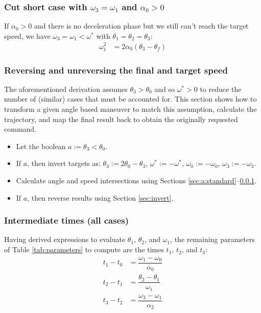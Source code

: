 \documentclass[12pt, a4paper]
{article}
\providecommand{\lr}[1]{\left(#1\right)}
\providecommand{\w}{\omega}
\providecommand{\wt}{\w^*}
\renewcommand{\th}{\theta}
\renewcommand{\a}{\alpha}
\begin{document}
\subsubsection{Cut short case with $\w_3 = \w_1$ and $\a_0 > 0$}
\label{sec:a:cutshortw3isw1}

If $\a_0 > 0$ and there is no deceleration phase but we still can't reach the
target speed, we have $\w_3=\w_1 < \wt$ with $\th_1=\th_2=\th_3$:
%
\begin{align}
    \label{eq:a:cutshortw1}
    \w_1^2  &= 2\a_0\lr{\th_3 - \th_f}
\end{align}

\subsubsection{Reversing and unreversing the final and target speed}
\label{sec:a:reversing}
The aforementioned derivation assumes $\th_3 > \th_0$ and so $\wt > 0$ to
reduce the number of (similar) cases that must be accounted for. This section
shows how to transform a given angle based maneuver to match this assumption,
calculate the trajectory, and map the final result back to obtain the
originally requested command.

\begin{itemize}
    \item Let the boolean $a := \th_3 < \th_0$.
    \item If $a$, then invert targets as:
          $\th_3 := 2 \th_0 - \th_3$, $\wt := -\wt$, $\w_0 := -\w_0$,
          $\w_3 := -\w_3$.
    \item Calculate angle and speed intersections using
          Sections \ref{sec:a:standard}--\ref{sec:a:cutshortw3isw1}.
    \item If $a$, then reverse results using Section \ref{sec:invert}.
\end{itemize}


\subsubsection{Intermediate times (all cases)}

Having derived expressions to evaluate $\th_1$, $\th_2$, and $\w_1$, the
remaining parameters of Table \ref{tab:parameters} to compute are the times
$t_1$, $t_2$, and $t_3$:
%
\begin{align}
    t_1 - t_0 &= \dfrac{\w_1-\w_0}{\a_0}\\[1em]
    t_2 - t_1 &= \dfrac{\th_2-\th_1}{\w_1}\\[1em]
    t_3 - t_2 &= \dfrac{\w_3-\w_1}{\a_2}
\end{align}
\end{document}
